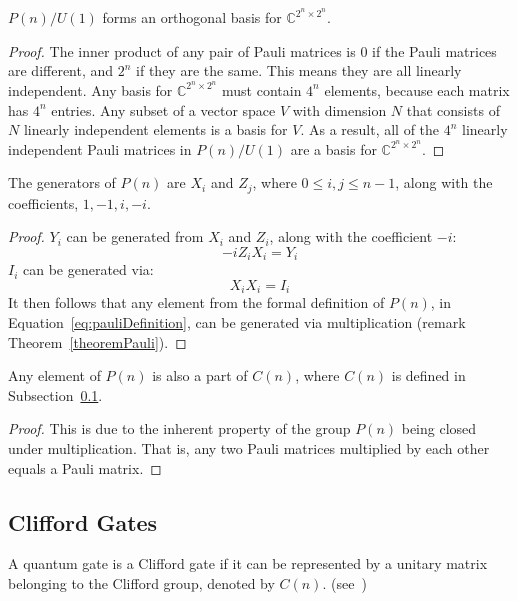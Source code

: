 \begin{corollary}
\label{corollary:paulisFormBasis}
$P(n) / U(1)$ forms an orthogonal basis for $\mathbb{C}^{2^n \times 2^n}$.
\end{corollary}
\begin{proof}
The inner product of any pair of Pauli matrices is $0$ if the Pauli matrices are different, and $2^n$ if they are the same. This means they are all linearly independent. Any basis for $\mathbb{C}^{2^n \times 2^n}$ must contain $4^{n}$ elements, because each matrix has $4^n$ entries. Any subset of a vector space $V$ with dimension $N$ that consists of $N$ linearly independent elements is a basis for $V$. As a result, all of the $4^{n}$ linearly independent Pauli matrices in $P(n) / U(1)$ are a basis for $\mathbb{C}^{2^n \times 2^n}$. 
\end{proof}

\begin{theorem}
\label{theorem:pauliGenerators}
The generators of $P(n)$ are $X_i$ and $Z_j$, where $0 \leq i, j \leq n-1$, along with the coefficients, $1,-1,i,-i$.
\end{theorem}
\begin{proof}
$Y_i$ can be generated from $X_i$ and $Z_i$, along with the coefficient $-i$:
$$-iZ_iX_i = Y_i$$
$I_i$ can be generated via:
$$X_iX_i = I_i$$
It then follows that any element from the formal definition of $P(n)$, in Equation~\eqref{eq:pauliDefinition}, can be generated via multiplication (remark Theorem~\ref{theoremPauli}).
\end{proof}

\begin{theorem}
\label{theorem:paulisAreCliffords}
Any element of $P(n)$ is also a part of $C(n)$, where $C(n)$ is defined in Subsection~\ref{subsubsection:Clifford}.
\end{theorem}
\begin{proof}
This is due to the inherent property of the group $P(n)$ being closed under multiplication. That is, any two Pauli matrices multiplied by each other equals a Pauli matrix.
\end{proof}

\subsection{Clifford Gates}
\label{subsubsection:Clifford}
A quantum gate is a Clifford gate if it can be represented by a unitary matrix belonging to the Clifford group, denoted by $C(n)$. (see~\cite{gottesman1997stabilizer})

